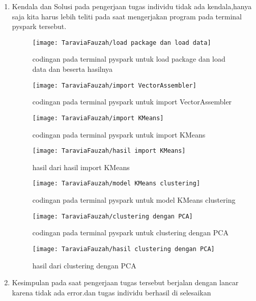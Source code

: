 \begin{enumerate}
\item Kendala dan Solusi
\newline pada pengerjaan tugas individu tidak ada kendala,hanya saja kita harus lebih teliti pada saat mengerjakan program pada terminal pyspark tersebut.

\begin{figure}[!ht]
\texttt{[image: TaraviaFauzah/load package dan load data]}
\caption{codingan pada terminal pyspark untuk load package dan load data dan beserta hasilnya }
\label{gam:perkuliahan2-15}
\end{figure}

\newpage
\begin{figure}[!ht]
\texttt{[image: TaraviaFauzah/import VectorAssembler]}
\caption{codingan pada terminal pyspark untuk import VectorAssembler }
\label{gam:perkuliahan2-15}
\end{figure}

\begin{figure}[!ht]
\texttt{[image: TaraviaFauzah/import KMeans]}
\caption{codingan pada terminal pyspark untuk import KMeans }
\label{gam:perkuliahan2-15}
\end{figure}

\begin{figure}[!ht]
\texttt{[image: TaraviaFauzah/hasil import KMeans]}
\caption{hasil dari hasil import KMeans }
\label{gam:perkuliahan2-15}
\end{figure}

\newpage
\begin{figure}[!ht]
\texttt{[image: TaraviaFauzah/model KMeans clustering]}
\caption{codingan pada terminal pyspark untuk model KMeans clustering}
\label{gam:perkuliahan2-15}
\end{figure}

\begin{figure}[!ht]
\texttt{[image: TaraviaFauzah/clustering dengan PCA]}
\caption{codingan pada terminal pyspark untuk clustering dengan PCA}
\label{gam:perkuliahan2-15}
\end{figure}

\begin{figure}[!ht]
\texttt{[image: TaraviaFauzah/hasil clustering dengan PCA]}
\caption{hasil dari clustering dengan PCA}
\label{gam:perkuliahan2-15}
\end{figure}

\item Kesimpulan
\newline pada saat pengerjaan tugas tersebut berjalan dengan lancar karena tidak ada error.dan tugas individu berhasil di selesaikan

\end{enumerate}

